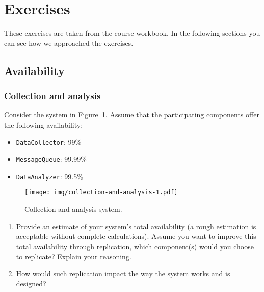 \section{Exercises}

These exercises are taken from the course workbook\cite{exerciseBook}. In the following sections you can see how we approached the exercises.

\subsection{Availability}

\subsubsection{Collection and analysis}

\descriptionproblem
Consider the system in Figure~\ref{fig: exercises - collection and analysis system}. Assume that the participating components offer the following availability:
\begin{itemize}
    \item \texttt{DataCollector}: 99\%
    \item \texttt{MessageQueue}: 99.99\%
    \item \texttt{DataAnalyzer}: 99.5\%
\end{itemize}

\begin{figure}[!htp]
    \centering
    \texttt{[image: img/collection-and-analysis-1.pdf]}
    \caption{Collection and analysis system.}
    \label{fig: exercises - collection and analysis system}
\end{figure}

\questionproblem
\begin{enumerate}
    \item Provide an estimate of your system's total availability (a rough estimation is acceptable without complete calculations). Assume you want to improve this total availability through replication, which component(s) would you choose to replicate? Explain your reasoning.
    
    \item How would such replication impact the way the system works and is designed?
\end{enumerate}

